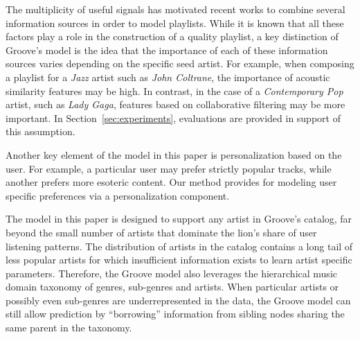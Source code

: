 The multiplicity of useful signals has motivated recent works  \cite{personalized_playlist_schedl,McFee_multi_similarities} to combine several information sources in order to model playlists. %
While it is known that all these factors play a role in the construction of a quality playlist, a key distinction of Groove's model is the idea that the importance of each of these information sources varies depending on the specific seed artist. For example, when composing a playlist for a \textit{Jazz} artist such as \textit{John Coltrane}, the importance of acoustic similarity features may be high. In contrast, in the case of a \textit{Contemporary Pop} artist, such as \textit{Lady Gaga}, features based on collaborative filtering may be more important. In Section~\ref{sec:experiments}, evaluations are provided in support of this assumption.
 
Another key element of the model in this paper is personalization based on the user. For example, a particular user may prefer strictly popular tracks, while another prefers more esoteric content. %
Our method provides for modeling user specific preferences via a personalization component.



The model in this paper is designed to support any artist in Groove's catalog, far beyond the small number of artists that dominate the lion's share of user listening patterns. The distribution of artists in the catalog contains a long tail of less popular artists for which insufficient information exists to learn artist specific parameters. Therefore, the Groove model also leverages the hierarchical music domain taxonomy of genres, sub-genres and artists. %
When particular artists or possibly even sub-genres are underrepresented in the data, the Groove model can still allow prediction by ``borrowing'' information from sibling nodes sharing the same parent in the taxonomy. %


